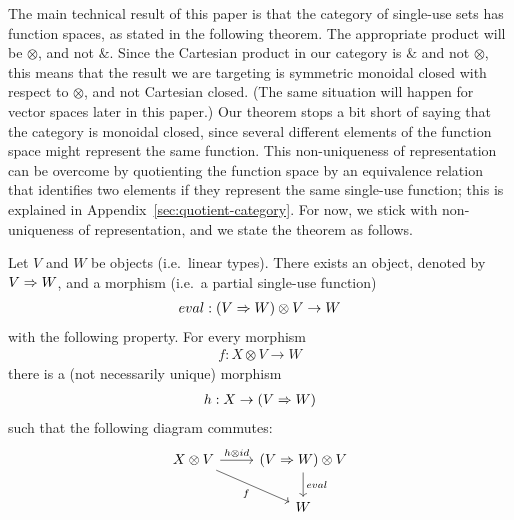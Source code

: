  
The main technical result of this paper is that the category of single-use sets has function spaces, as stated in the following theorem.  The appropriate product will be $\otimes$, and not $\&$. Since the Cartesian product in our category is $\&$ and not $\otimes$, this means that the result we are targeting is symmetric monoidal closed with respect to $\otimes$, and not Cartesian closed. (The same situation will happen  for vector spaces later in this paper.)  Our theorem stops a bit short of saying that the category is monoidal closed, since several different elements of the function space might represent the same function. This non-uniqueness of representation can be overcome  by quotienting the function space  by an equivalence relation that identifies two elements if they represent the same single-use function; this is explained in Appendix~\ref{sec:quotient-category}. For now, we stick with non-uniqueness of representation, and we state the theorem as follows.

\begin{theorem}\label{thm:single-use-closed}
    Let $V$ and $W$ be objects (i.e.~linear types). There exists an object, denoted by  $V \Rightarrow W$, and a morphism (i.e.~a partial single-use function)
    \begin{align*}
    eval : (V \Rightarrow W) \otimes V \to  W
    \end{align*}
    with the following property. For every morphism
    \begin{align*}
    f : {X \otimes V} \to  W
    \end{align*}
    there is a (not necessarily unique) morphism
    \begin{align*}
    h :  X \to (V \Rightarrow W)
    \end{align*}
    such that the following diagram commutes:
    \[
    \begin{tikzcd}
    X \otimes V 
    \arrow[r,"h \otimes id"]
    \arrow[dr,"f"']
    &
    (\funspace V W) \otimes V
    \arrow[d,"eval"] \\
    &
    W
    \end{tikzcd}
    \]
\end{theorem}

